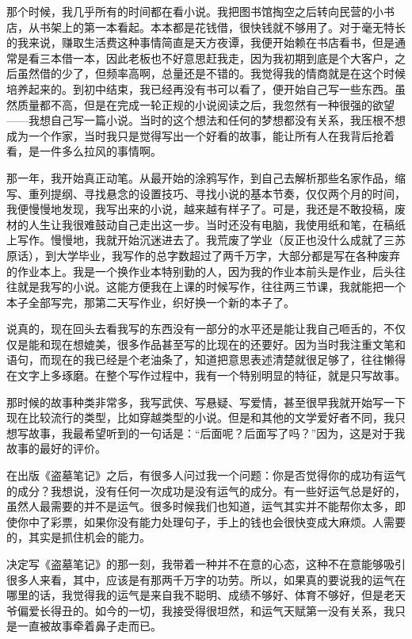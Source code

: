 那个时候，我几乎所有的时间都在看小说。我把图书馆掏空之后转向民营的小书店，从书架上的第一本看起。本本都是花钱借，很快钱就不够用了。对于毫无特长的我来说，赚取生活费这种事情简直是天方夜谭，我便开始赖在书店看书，但是通常是看三本借一本，因此老板也不好意思赶我走，因为我初期到底是个大客户，之后虽然借的少了，但频率高啊，总量还是不错的。我觉得我的情商就是在这个时候培养起来的。到初中结束，我已经再没有书可以看了，便开始自己写一些东西。虽然质量都不高，但是在完成一轮正规的小说阅读之后，我忽然有一种很强的欲望——我想自己写一篇小说。当时的这个想法和任何的梦想都没有关系，我压根不想成为一个作家，当时我只是觉得写出一个好看的故事，能让所有人在我背后抢着看，是一件多么拉风的事情啊。

那一年，我开始真正动笔。从最开始的涂鸦写作，到自己去解析那些名家作品，缩写、重列提纲、寻找悬念的设置技巧、寻找小说的基本节奏，仅仅两个月的时间，我便慢慢地发现，我写出来的小说，越来越有样子了。可是，我还是不敢投稿，废材的人生让我很难鼓动自己走出这一步。当时还没有电脑，我使用纸和笔，在稿纸上写作。慢慢地，我就开始沉迷进去了。我荒废了学业（反正也没什么成就了三苏原话），到大学毕业，我写作的总字数超过了两千万字，大部分都是写在各种废弃的作业本上。我是一个换作业本特别勤的人，因为我的作业本前头是作业，后头往往就是我写的小说。这能方便我在上课的时候写作，往往两三节课，我就能把一个本子全部写完，那第二天写作业，织好换一个新的本子了。

说真的，现在回头去看我写的东西没有一部分的水平还是能让我自己咂舌的，不仅仅是能和现在想媲美，很多作品甚至写的比现在的还要好。因为当时我注重文笔和语句，而现在的我已经是个老油条了，知道把意思表述清楚就很足够了，往往懒得在文字上多琢磨。在整个写作过程中，我有一个特别明显的特征，就是只写故事。

那时候的故事种类非常多，我写武侠、写悬疑、写爱情，甚至很早我就开始写一下现在比较流行的类型，比如穿越类型的小说。但是和其他的文学爱好者不同，我只想写故事，我最希望听到的一句话是：“后面呢？后面写了吗？”因为，这是对于我故事的最好的评价。

在出版《盗墓笔记》之后，有很多人问过我一个问题：你是否觉得你的成功有运气的成分？我想说，没有任何一次成功是没有运气的成分。有一些好运气总是好的，虽然人最需要的并不是运气。很多时候我们也知道，运气其实并不能帮你太多，即使你中了彩票，如果你没有能力处理句子，手上的钱也会很快变成大麻烦。人需要的，其实是抓住机会的能力。

决定写《盗墓笔记》的那一刻，我带着一种并不在意的心态，这种不在意能够吸引很多人来看，其中，应该是有那两千万字的功劳。所以，如果真的要说我的运气在哪里的话，我觉得我的运气是来自我不聪明、成绩不够好、体育不够好，但是老天爷偏爱长得丑的。如今的一切，我接受得很坦然，和运气天赋第一没有关系，我只是一直被故事牵着鼻子走而已。

